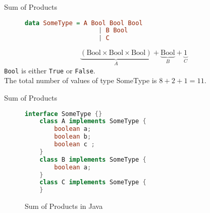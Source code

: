 \begin{frame}[fragile]{Sum of Products}
    \begin{figure}
        \centering
        \begin{minipage}{.5\textwidth}
            \begin{lstlisting}[language=Haskell]
    data SomeType = A Bool Bool Bool
                    | B Bool
                    | C
            \end{lstlisting}
        \end{minipage} 
    \end{figure}
    
    
    \begin{examples}
        \begin{equation*}
            \underbrace{(\text{Bool} \times \text{Bool} \times \text{Bool})}_{A} + \underbrace{\text{Bool}}_{B} + \underbrace{1}_{C}
        \end{equation*}
        \texttt{Bool} is either \texttt{True} or \texttt{False}.\\
        The total number of values of type SomeType is $8 + 2 + 1 = 11$.
    \end{examples}
\end{frame}

\begin{frame}[fragile]{Sum of Products}
    \begin{figure}
        \centering
        \begin{minipage}{\textwidth}
            \centering
            \begin{lstlisting}[language=Java]
    interface SomeType {}
    class A implements SomeType {
        boolean a;
        boolean b;
        boolean c ;
    }
    class B implements SomeType {
        boolean a;
    }
    class C implements SomeType {
    }
            \end{lstlisting}
        \end{minipage}
        \caption{Sum of Products in Java}
    \end{figure}
\end{frame}
